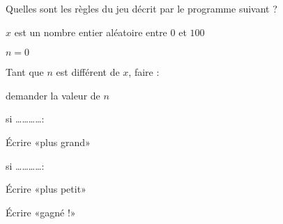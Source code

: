
\begin{exercice}\label{exosmath-0587}

    Quelles sont les règles du jeu décrit par le programme suivant ?

    \begin{fmpage}{0.9\linewidth}

    \( x\) est un nombre entier aléatoire entre \( 0\) et \( 100\)

    \( n=0\)

    Tant que \( n\) est différent de \( x\), faire :

    \hspace{0.5cm} demander la valeur de \( n\)

    \hspace{0.5cm} si \ldots\ldots\ldots\ldots :

    \hspace{1cm} Écrire «plus grand» 

    \hspace{0.5cm} si \ldots\ldots\ldots\ldots :

    \hspace{1cm} Écrire «plus petit» 

    Écrire «gagné !» 

\end{fmpage}

\end{exercice}
